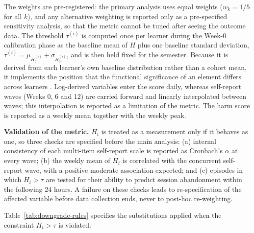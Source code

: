 \documentclass[12pt,a4paper]{article}
\begin{document}
\begin{justify}
The weights are pre-registered: the primary analysis uses equal weights ($w_k = 1/5$ for all $k$), and any alternative weighting is reported only as a pre-specified sensitivity analysis, so that the metric cannot be tuned after seeing the outcome data. The threshold $\tau^{(i)}$ is computed once per learner during the Week-0 calibration phase as the baseline mean of $H$ plus one baseline standard deviation, $\tau^{(i)} = \mu_{H_0^{(i)}} + \sigma_{H_0^{(i)}}$, and is then held fixed for the semester. Because it is derived from each learner's own baseline distribution rather than a cohort mean, it implements the position that the functional significance of an element differs across learners \parencite{gao2024sdt}. Log-derived variables enter the score daily, whereas self-report waves (Weeks 0, 6 and 12) are carried forward and linearly interpolated between waves; this interpolation is reported as a limitation of the metric. The harm score is reported as a weekly mean together with the weekly peak.

\textbf{Validation of the metric.} $H_t$ is treated as a measurement only if it behaves as one, so three checks are specified before the main analysis: (a) internal consistency of each multi-item self-report scale is reported as Cronbach's $\alpha$ at every wave; (b) the weekly mean of $H_t$ is correlated with the concurrent self-report wave, with a positive moderate association expected; and (c) episodes in which $H_t > \tau$ are tested for their ability to predict session abandonment within the following 24 hours. A failure on these checks leads to re-specification of the affected variable before data collection ends, never to post-hoc re-weighting.

Table~\ref{tab:downgrade-rules} specifies the substitutions applied when the constraint $H_t > \tau$ is violated.


\end{justify}
\end{document}
